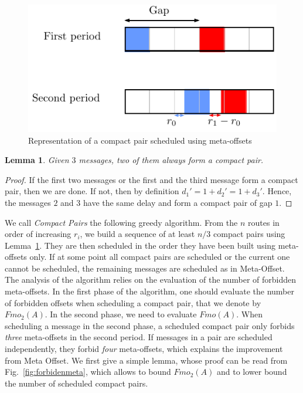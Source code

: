 \documentclass[10pt, conference, letterpaper]{IEEEtran}
\newtheorem{lemma}[theorem]{Lemma}
\begin{document}
\begin{figure}[h]
\begin{center}

\includegraphics[scale=0.7]{compact_pair}
\end{center}
\caption{Representation of a compact pair scheduled using meta-offsets}
\label{fig:compactpair}
\end{figure}

\begin{lemma}\label{lemma:pair_find}
Given $3$ messages, two of them always form a compact pair. 
\end{lemma}
\begin{proof}
If the first two messages or the first and the third message form a compact pair,
then we are done. If not, then by definition $d_{1}' = 1 + d_{2}' = 1 + d_{3}'$. Hence, the messages $2$ and $3$ have the same delay and form a compact pair of gap $1$.
\end{proof}

We call \emph{Compact Pairs} the following greedy algorithm. From the $n$ routes in order
of increasing $r_i$, we build a sequence of at least $n/3$ compact pairs using Lemma~\ref{lemma:pair_find}. They are then scheduled in the order they have been built using meta-offsets only. If at some point all compact pairs are scheduled or the current one cannot be scheduled, the remaining messages are scheduled as in Meta-Offset. The analysis of the algorithm relies on the evaluation of the number of forbidden meta-offsets. In the first phase of the algorithm, one should evaluate the number of forbidden offsets when scheduling a compact pair, that we denote by $Fmo_2(A)$. In the second phase, we need to evaluate $Fmo(A)$. When scheduling a message in the second phase, a scheduled compact pair only forbids \emph{three} meta-offsets in the second period. If messages in a pair are scheduled independently, they forbid \emph{four} meta-offsets, which explains the improvement from Meta Offset. We first give a simple lemma, whose proof can be read from Fig.~\ref{fig:forbidenmeta}, which allows to bound $Fmo_2(A)$ and to lower bound the number of scheduled compact pairs.
\end{document}
